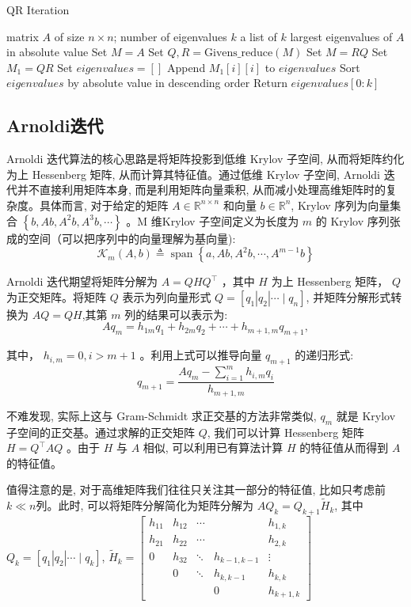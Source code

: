 \documentclass{source/Report}
\begin{document}
\begin{algorithm}
  \caption{QR Iteration}
  \begin{algorithmic}[1]
    \Require matrix $A$ of size $n \times n$; number of eigenvalues $k$
    \Ensure a list of $k$ largest eigenvalues of $A$ in absolute value
    \State Set $M = A$
    \State Set $Q, R = \text{Givens\_reduce}(M)$
    \State Set $M = R Q$
    \EndFor
    \State Set $M_1 = Q R$
    \State Set $eigenvalues = []$
    \State Append $M_1[i][i]$ to $eigenvalues$
    \EndFor
    \State Sort $eigenvalues$ by absolute value in descending order
    \State Return $eigenvalues[0:k]$
  \end{algorithmic}
\end{algorithm}

\subsection{Arnoldi迭代}

Arnoldi 迭代算法的核心思路是将矩阵投影到低维 Krylov 子空间, 从而将矩阵约化为上 Hessenberg 矩阵, 从而计算其特征值。通过低维 Krylov 子空间, Arnoldi 迭代并不直接利用矩阵本身, 而是利用矩阵向量乘积, 从而减小处理高维矩阵时的复杂度。具体而言, 对于给定的矩阵 $A \in \mathbb{R}^{n \times n}$ 和向量 $b \in \mathbb{R}^n$, Krylov 序列为向量集合 $\left\{b, A b, A^2 b, A^3 b, \cdots\right\}$ 。M 维Krylov 子空间定义为长度为 $m$ 的 Krylov 序列张成的空间（可以把序列中的向量理解为基向量):
$$
  \mathcal{K}_m(A, b) \triangleq \operatorname{span}\left\{a, A b, A^2 b, \cdots, A^{m-1} b\right\}
$$

Arnoldi 迭代期望将矩阵分解为 $A=Q H Q^{\top}$ ，其中 $H$ 为上 Hessenberg 矩阵， $Q$ 为正交矩阵。将矩阵 $Q$ 表示为列向量形式 $Q=\left[q_1\left|q_2\right| \cdots \mid q_n\right]$, 并矩阵分解形式转换为 $A Q=Q H$,其第 $m$ 列的结果可以表示为:
$$
  A q_m=h_{1 m} q_1+h_{2 m} q_2+\cdots+h_{m+1, m} q_{m+1},
$$

其中， $h_{i, m}=0, i>m+1$ 。利用上式可以推导向量 $q_{m+1}$ 的递归形式:
$$
  q_{m+1}=\frac{A q_m-\sum_{i=1}^m h_{i, m} q_i}{h_{m+1, m}}
$$

不难发现, 实际上这与 Gram-Schmidt 求正交基的方法非常类似, $q_m$ 就是 Krylov 子空间的正交基。通过求解的正交矩阵 $Q$, 我们可以计算 Hessenberg 矩阵 $H=Q^{\top} A Q$ 。由于 $H$ 与 $A$ 相似, 可以利用已有算法计算 $H$ 的特征值从而得到 $A$ 的特征值。

值得注意的是, 对于高维矩阵我们往往只关注其一部分的特征值, 比如只考虑前 $k \ll n$列。此时, 可以将矩阵分解简化为矩阵分解为 $A Q_k=Q_{k+1} \tilde{H}_k$, 其中 $Q_k=\left[q_1\left|q_2\right| \cdots \mid q_k\right]$, $\tilde{H}_k=\left[\begin{array}{ccccc}h_{11} & h_{12} & \cdots & & h_{1, k} \\ h_{21} & h_{22} & \cdots & & h_{2, k} \\ 0 & h_{32} & \ddots & h_{k-1, k-1} & \vdots \\ & 0 & \ddots & h_{k, k-1} & h_{k, k} \\ & & & 0 & h_{k+1, k}\end{array}\right]$
\end{document}
